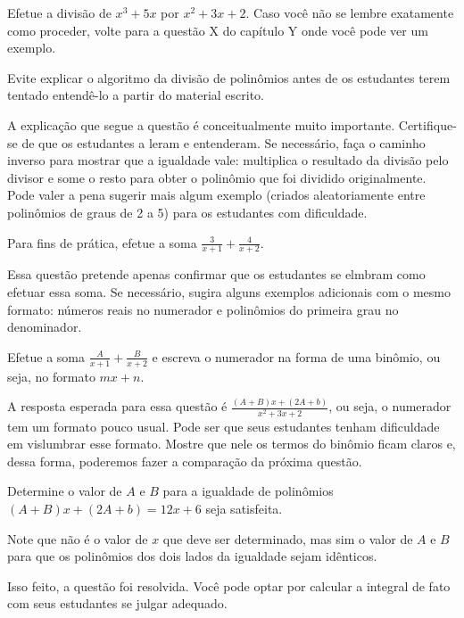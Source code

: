 \documentclass[main_estudante.tex]{subfiles}
\begin{document}
\begin{questao}
Efetue a divisão de ${x^3+5x}$ por ${x^2+3x+2}$. Caso você não se lembre exatamente como proceder, volte para a questão X do capítulo Y onde você pode ver um exemplo.
\end{questao}

Evite explicar o algoritmo da divisão de polinômios antes de os estudantes terem tentado entendê-lo a partir do material escrito.

A explicação que segue a questão é conceitualmente muito importante. Certifique-se de que os estudantes a leram e entenderam. Se necessário, faça o caminho inverso para mostrar que a igualdade vale: multiplica o resultado da divisão pelo divisor e some o resto para obter o polinômio que foi dividido originalmente. Pode valer a pena sugerir mais algum exemplo (criados aleatoriamente entre polinômios de graus de 2 a 5) para os estudantes com dificuldade.

\begin{questao}
Para fins de prática, efetue a soma $\frac{3}{x+1}+\frac{4}{x+2}$.
\end{questao}

Essa questão pretende apenas confirmar que os estudantes se elmbram como efetuar essa soma. Se necessário, sugira alguns exemplos adicionais com o mesmo formato: números reais no numerador e polinômios do primeira grau no denominador.

\begin{questao}
Efetue a soma $\frac{A}{x+1}+\frac{B}{x+2}$ e escreva o numerador na forma de uma binômio, ou seja, no formato $mx+n$.
\end{questao}

A resposta esperada para essa questão é $\frac{(A+B)x+(2A+b)}{x^2+3x+2}$, ou seja, o numerador tem um formato pouco usual. Pode ser que seus estudantes tenham dificuldade em vislumbrar esse formato. Mostre que nele os termos do binômio ficam claros e, dessa forma, poderemos fazer a comparação da próxima questão.

\begin{questao}
Determine o valor de $A$ e $B$ para a igualdade de polinômios $(A+B)x+(2A+b)=12x+6$ seja satisfeita.
\end{questao}

Note que não é o valor de $x$ que deve ser determinado, mas sim o valor de $A$ e $B$ para que os polinômios dos dois lados da igualdade sejam idênticos.

Isso feito, a questão foi resolvida. Você pode optar por calcular a integral de fato com seus estudantes se julgar adequado.
\end{document}
